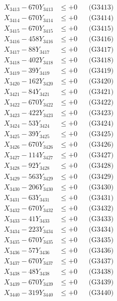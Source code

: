 \documentclass[a4paper,10pt]{article}
\begin{document}
{\begin{align}
X_{3413} - 670Y_{3413} &\leq +0 && \text{(G3413)} \\
X_{3414} - 670Y_{3414} &\leq +0 && \text{(G3414)} \\
X_{3415} - 670Y_{3415} &\leq +0 && \text{(G3415)} \\
X_{3416} - 458Y_{3416} &\leq +0 && \text{(G3416)} \\
X_{3417} - 88Y_{3417} &\leq +0 && \text{(G3417)} \\
X_{3418} - 402Y_{3418} &\leq +0 && \text{(G3418)} \\
X_{3419} - 39Y_{3419} &\leq +0 && \text{(G3419)} \\
X_{3420} - 162Y_{3420} &\leq +0 && \text{(G3420)} \\
\allowbreak
X_{3421} - 84Y_{3421} &\leq +0 && \text{(G3421)} \\
X_{3422} - 670Y_{3422} &\leq +0 && \text{(G3422)} \\
X_{3423} - 422Y_{3423} &\leq +0 && \text{(G3423)} \\
X_{3424} - 53Y_{3424} &\leq +0 && \text{(G3424)} \\
X_{3425} - 39Y_{3425} &\leq +0 && \text{(G3425)} \\
X_{3426} - 670Y_{3426} &\leq +0 && \text{(G3426)} \\
X_{3427} - 114Y_{3427} &\leq +0 && \text{(G3427)} \\
X_{3428} - 92Y_{3428} &\leq +0 && \text{(G3428)} \\
X_{3429} - 563Y_{3429} &\leq +0 && \text{(G3429)} \\
X_{3430} - 206Y_{3430} &\leq +0 && \text{(G3430)} \\
\allowbreak
X_{3431} - 63Y_{3431} &\leq +0 && \text{(G3431)} \\
X_{3432} - 670Y_{3432} &\leq +0 && \text{(G3432)} \\
X_{3433} - 41Y_{3433} &\leq +0 && \text{(G3433)} \\
X_{3434} - 223Y_{3434} &\leq +0 && \text{(G3434)} \\
X_{3435} - 670Y_{3435} &\leq +0 && \text{(G3435)} \\
X_{3436} - 57Y_{3436} &\leq +0 && \text{(G3436)} \\
X_{3437} - 670Y_{3437} &\leq +0 && \text{(G3437)} \\
X_{3438} - 48Y_{3438} &\leq +0 && \text{(G3438)} \\
X_{3439} - 670Y_{3439} &\leq +0 && \text{(G3439)} \\
X_{3440} - 319Y_{3440} &\leq +0 && \text{(G3440)} \\

\end{align}}
\end{document}
